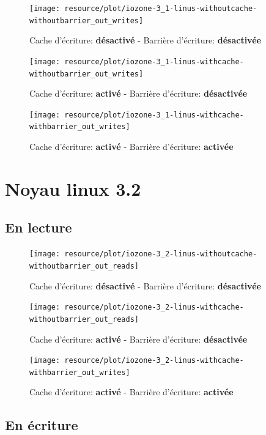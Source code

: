 \begin{figure}[H]
	\centering
	\texttt{[image: resource/plot/iozone-3\_1-linus-withoutcache-withoutbarrier\_out\_writes]}
	\caption{Cache d'écriture: \textbf{désactivé}   -   Barrière d'écriture: \textbf{désactivée}}
\end{figure}

\begin{figure}[H]
	\centering
	\texttt{[image: resource/plot/iozone-3\_1-linus-withcache-withoutbarrier\_out\_writes]}
	\caption{Cache d'écriture: \textbf{activé}   -   Barrière d'écriture: \textbf{désactivée}}
\end{figure}

\begin{figure}[H]
	\centering
	\texttt{[image: resource/plot/iozone-3\_1-linus-withcache-withbarrier\_out\_writes]}
	\caption{Cache d'écriture: \textbf{activé}   -   Barrière d'écriture: \textbf{activée}}
\end{figure}

\section{Noyau linux 3.2}

\subsection*{En lecture}

\begin{figure}[H]
	\centering
	\texttt{[image: resource/plot/iozone-3\_2-linus-withoutcache-withoutbarrier\_out\_reads]}
	\caption{Cache d'écriture: \textbf{désactivé}   -   Barrière d'écriture: \textbf{désactivée}}
\end{figure}

\begin{figure}[H]
	\centering
	\texttt{[image: resource/plot/iozone-3\_2-linus-withcache-withoutbarrier\_out\_reads]}
	\caption{Cache d'écriture: \textbf{activé}   -   Barrière d'écriture: \textbf{désactivée}}
\end{figure}

\begin{figure}[H]
	\centering
	\texttt{[image: resource/plot/iozone-3\_2-linus-withcache-withbarrier\_out\_writes]}
	\caption{Cache d'écriture: \textbf{activé}   -   Barrière d'écriture: \textbf{activée}}
\end{figure}

\subsection*{En écriture}

